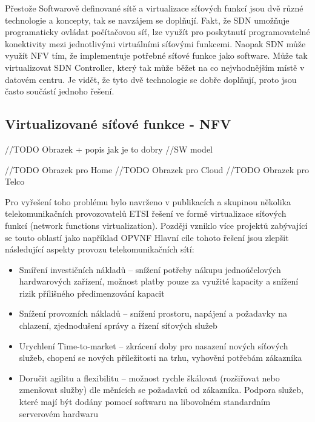 Přestože Softwarově definované sítě a virtualizace síťových funkcí jsou dvě různé technologie a koncepty, tak se navzájem se doplňují. Fakt, že SDN umožňuje programaticky ovládat počítačovou síť, lze využít pro poskytnutí programovatelné konektivity mezi jednotlivými virtuálními síťovými funkcemi. Naopak SDN může využít NFV tím, že implementuje potřebné síťové funkce jako software. Může tak virtualizovat SDN Controller, který tak může běžet na co nejvhodnějším místě v datovém centru. Je vidět, že tyto dvě technologie se dobře doplňují, proto jsou často součástí jednoho řešení. \cite{SDN_book}


\subsection{Virtualizované síťové funkce - NFV}

//TODO Obrazek + popis jak je to dobry
//SW model

//TODO Obrazek pro Home
//TODO Obrazek pro Cloud
//TODO Obrazek pro Telco


Pro vyřešení toho problému bylo navrženo v publikacích \cite{NFV_paper2012} a \cite{NFV_paper2013} skupinou několika telekomunikačních provozovatelů ETSI řešení ve formě virtualizace síťových funkcí (network functions virtualization). Později vzniklo více projektů zabývající se touto oblastí jako například OPVNF \cite{OPNFV}  Hlavní cíle tohoto řešení jsou zlepšit následující aspekty provozu telekomunikačních sítí:

\begin{itemize}
\item Smíření investičních nákladů – snížení potřeby nákupu jednoúčelových hardwarových zařízení, možnost platby pouze za využité kapacity a snížení rizik přílišného předimenzování kapacit
\item Snížení provozních nákladů – snížení prostoru, napájení a požadavky na chlazení, zjednodušení správy a řízení síťových služeb
\item Urychlení Time-to-market – zkrácení doby pro nasazení nových síťových služeb, chopení se nových příležitosti na trhu, vyhovění potřebám zákazníka
\item Doručit agilitu a flexibilitu – možnost rychle škálovat (rozšiřovat nebo zmenšovat služby) dle měnících se požadavků od zákazníka. Podpora služeb, které mají být dodány pomocí softwaru na libovolném standardním serverovém hardwaru
\end{itemize}

